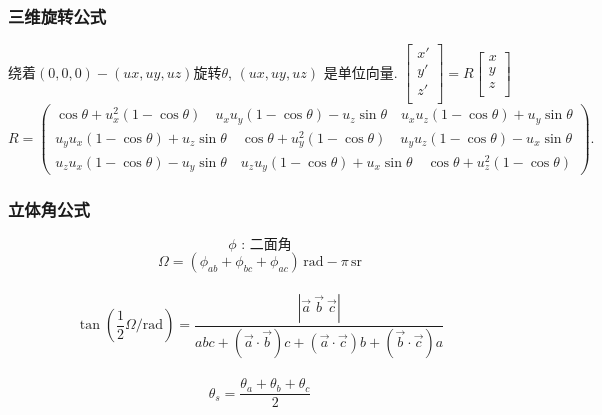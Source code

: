 \begin{small}
\begin{spacing}{0.5}
\subsubsection{三维旋转公式}
绕着$(0,0,0)-(ux,uy,uz)$旋转$\theta$, $(ux,uy,uz)$ 是单位向量. $
	\begin{bmatrix}
	x' \\
	y' \\
	z' \\
	\end{bmatrix} = R
	\begin{bmatrix}
	x \\
	y \\
	z \\
	\end{bmatrix}
	$
\[
R = \left(\begin{smallmatrix}
	\cos \theta +u_x^2 \left(1-\cos \theta\right) \quad
	u_x u_y \left(1-\cos \theta\right) - u_z \sin \theta \quad u_x u_z \left(1-\cos \theta\right) + u_y \sin \theta \\ u_y u_x \left(1-\cos \theta\right) + u_z \sin \theta \quad \cos \theta + u_y^2\left(1-\cos \theta\right) \quad u_y u_z \left(1-\cos \theta\right) - u_x \sin \theta \\ u_z u_x \left(1-\cos \theta\right) - u_y \sin \theta \quad u_z u_y \left(1-\cos \theta\right) + u_x \sin \theta \quad \cos \theta + u_z^2\left(1-\cos \theta\right) 
\end{smallmatrix}\right).
\]

\subsubsection{立体角公式}
\[ \phi \text{ : 二面角}\] 
\[ \Omega = \left(\phi_{ab} + \phi_{bc} + \phi_{ac}\right)\,\mathrm{rad} - \pi\,\mathrm{sr} \]\\
\[\tan \left( \frac{1}{2} \Omega/\mathrm{rad} \right) =
  \frac{\left|\vec a\ \vec b\ \vec c\right|}{abc + \left(\vec a \cdot \vec b\right)c + \left(\vec a \cdot \vec c\right)b + \left(\vec b \cdot \vec c\right)a}\]\\
\[\theta_s = \frac {\theta_a + \theta_b + \theta_c}{2}\]\\
\begin{multicols*}{2}
	

\end{multicols*}
\end{spacing}
\end{small}
